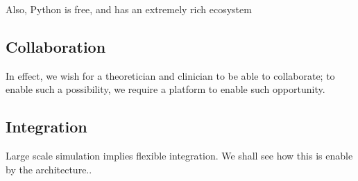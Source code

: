 Also, Python is free, and has an extremely rich ecosystem

\subsection{Collaboration}

In effect, we wish for a theoretician and clinician to be able to
collaborate; to enable such a possibility, we require a platform
to enable such opportunity. 

\subsection{Integration}

Large scale simulation implies flexible integration. We shall see
how this is enable by the architecture..

